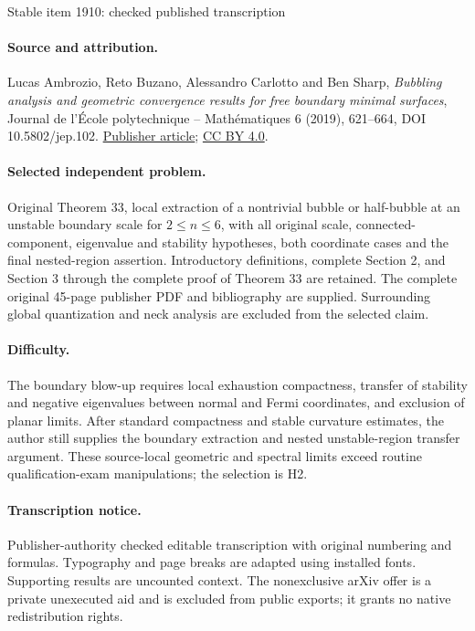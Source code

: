 \documentclass[10pt]{article}
\theoremstyle{definition}\newtheorem{definition}[thm]{Definition}
\numberwithin{equation}{section}
\begin{document}
\begin{center}{\Large Stable item 1910: checked published transcription}\end{center}
\paragraph{Source and attribution.} Lucas Ambrozio, Reto Buzano, Alessandro Carlotto and Ben Sharp, \emph{Bubbling analysis and geometric convergence results for free boundary minimal surfaces}, Journal de l'École polytechnique -- Mathématiques 6 (2019), 621--664, DOI 10.5802/jep.102. \href{https://jep.centre-mersenne.org/articles/10.5802/jep.102/}{Publisher article}; \href{https://creativecommons.org/licenses/by/4.0/}{CC BY 4.0}.
\paragraph{Selected independent problem.} Original Theorem 33, local extraction of a nontrivial bubble or half-bubble at an unstable boundary scale for $2\leq n\leq6$, with all original scale, connected-component, eigenvalue and stability hypotheses, both coordinate cases and the final nested-region assertion. Introductory definitions, complete Section 2, and Section 3 through the complete proof of Theorem 33 are retained. The complete original 45-page publisher PDF and bibliography are supplied. Surrounding global quantization and neck analysis are excluded from the selected claim.
\paragraph{Difficulty.} The boundary blow-up requires local exhaustion compactness, transfer of stability and negative eigenvalues between normal and Fermi coordinates, and exclusion of planar limits. After standard compactness and stable curvature estimates, the author still supplies the boundary extraction and nested unstable-region transfer argument. These source-local geometric and spectral limits exceed routine qualification-exam manipulations; the selection is H2.
\paragraph{Transcription notice.} Publisher-authority checked editable transcription with original numbering and formulas. Typography and page breaks are adapted using installed fonts. Supporting results are uncounted context. The nonexclusive arXiv offer is a private unexecuted aid and is excluded from public exports; it grants no native redistribution rights.
\end{document}
